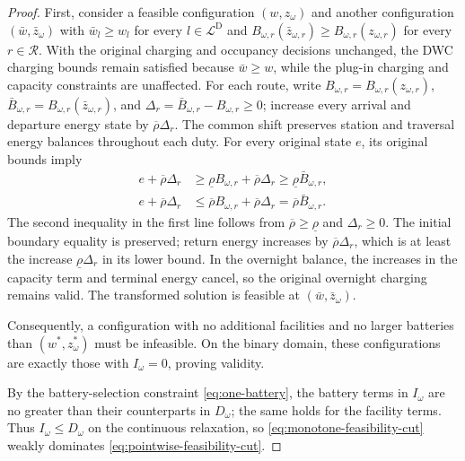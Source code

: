 \begin{proof}
First, consider a feasible configuration $(w,z_\omega)$ and another configuration $(\bar w,\bar z_\omega)$ with $\bar w_l\ge w_l$ for every $l\in\mathcal L^{\mathrm D}$ and $B_{\omega,r}(\bar z_{\omega,r})\ge B_{\omega,r}(z_{\omega,r})$ for every $r\in\mathcal R$.
With the original charging and occupancy decisions unchanged, the DWC charging bounds remain satisfied because $\bar w\ge w$, while the plug-in charging and capacity constraints are unaffected.
For each route, write $B_{\omega,r}=B_{\omega,r}(z_{\omega,r})$, $\bar B_{\omega,r}=B_{\omega,r}(\bar z_{\omega,r})$, and $\Delta_r=\bar B_{\omega,r}-B_{\omega,r}\ge0$; increase every arrival and departure energy state by $\overline\rho\Delta_r$.
The common shift preserves station and traversal energy balances throughout each duty.
For every original state $e$, its original bounds imply
\[
\begin{aligned}
 e+\overline\rho\Delta_r
 &\ge \underline\rho B_{\omega,r}+\overline\rho\Delta_r
 \ge \underline\rho\bar B_{\omega,r},\\
 e+\overline\rho\Delta_r
 &\le \overline\rho B_{\omega,r}+\overline\rho\Delta_r
 =\overline\rho\bar B_{\omega,r}.
\end{aligned}
\]
The second inequality in the first line follows from $\overline\rho\ge\underline\rho$ and $\Delta_r\ge0$.
The initial boundary equality is preserved; return energy increases by $\overline\rho\Delta_r$, which is at least the increase $\underline\rho\Delta_r$ in its lower bound.
In the overnight balance, the increases in the capacity term and terminal energy cancel, so the original overnight charging remains valid.
The transformed solution is feasible at $(\bar w,\bar z_\omega)$.

Consequently, a configuration with no additional facilities and no larger batteries than $(w^*,z_\omega^*)$ must be infeasible.
On the binary domain, these configurations are exactly those with $I_\omega=0$, proving validity.

By the battery-selection constraint \eqref{eq:one-battery}, the battery terms in $I_\omega$ are no greater than their counterparts in $D_\omega$; the same holds for the facility terms.
Thus $I_\omega\le D_\omega$ on the continuous relaxation, so \eqref{eq:monotone-feasibility-cut} weakly dominates \eqref{eq:pointwise-feasibility-cut}.
\end{proof}

